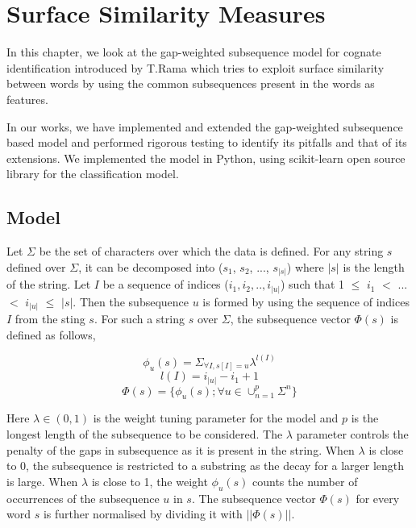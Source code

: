 \chapter{Surface Similarity Measures}

In this chapter, we look at the gap-weighted subsequence model for cognate identification introduced by T.Rama \citep{rama2015automatic} which tries to exploit surface similarity between words by using the common subsequences present in the words as features. 

In our works, we have implemented and extended the gap-weighted subsequence based model and performed rigorous testing to identify its pitfalls and that of its extensions. We implemented the model in Python, using scikit-learn \cite{scikit-learn} open source library for the classification model. 

\section{Model}

Let $\Sigma$ be the set of characters over which the data is defined. For any string $s$ defined over $\Sigma$, it can be decomposed into ($s_1$, $s_2$, ..., $s_{|s|}$) where $|s|$ is the length of the string. Let $I$ be a sequence of indices ($i_1, i_2, .., i_{|u|}$) such that 1 $\leq$ $i_1$ $<$ ... $<$ $i_{|u|}$ $\leq$ $|s|$. Then the subsequence $u$ is formed by using the sequence of indices $I$ from the sting $s$. For such a string $s$ over $\Sigma$, the subsequence vector $\Phi(s)$ is defined as follows,

\begin{equation}
\phi_u(s) = \Sigma_{\forall I, s[I] = u} \lambda^{l(I)}
\end{equation}
\begin{equation}
l(I) = i_{|u|} - i_1 + 1\end{equation}
\begin{equation}
\Phi(s) = \{\phi_u(s); \forall u \in \cup_{n=1}^p \Sigma^n\}
\end{equation}

Here $\lambda \in (0,1)$ is the weight tuning parameter for the model and $p$ is the longest length of the subsequence to be considered. The $\lambda$ parameter controls the penalty of the gaps in subsequence as it is present in the string. When $\lambda$ is close to 0, the subsequence is restricted to a substring as the decay for a larger length is large. When $\lambda$ is close to 1, the weight $\phi_u(s)$ counts the number of occurrences of the subsequence $u$ in $s$. The subsequence vector $\Phi(s)$ for every word $s$ is further normalised by dividing it with $||\Phi(s)||$. 

